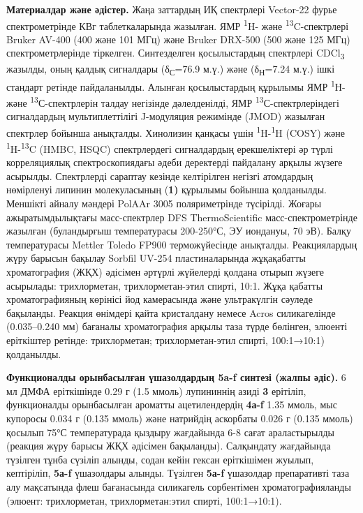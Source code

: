 \begin{multicols}{2}
{\bfseries Материалдар және әдістер.} Жаңа заттардың ИҚ спектрлері
Vector-22 фурье спектрометрінде КВг таблеткаларында жазылған. ЯМР
\textsuperscript{1}H- және \textsuperscript{13}C-спектрлері Bruker
AV-400 (400 және 101 МГц) және Bruker DRX-500 (500 және 125 МГц)
спектрометрлерінде тіркелген. Синтезделген қосылыстардың спектрлері
CDCl\textsubscript{3} жазылды, оның қалдық сигналдары
(δ\textsubscript{С}=76.9 м.ү.) және (δ\textsubscript{Н}=7.24 м.ү.) ішкі
стандарт ретінде пайдаланылды. Алынған қосылыстардың құрылымы ЯМР
\textsuperscript{1}Н- және \textsuperscript{13}С-спектрлерін талдау
негізінде дәлелденілді, ЯМР \textsuperscript{13}С-спектрлеріндегі
сигналдардың мультиплеттілігі J-модуляция режимінде (JMOD) жазылған
спектрлер бойынша анықталды. Хинолизин қанқасы үшін
\textsuperscript{1}H-\textsuperscript{1}H (COSY) және
\textsuperscript{1}H-\textsuperscript{13}C (HMBC, HSQC) спектрлердегі
сигналдардың ерекшеліктері әр түрлі корреляциялық спектроскопиядағы
әдеби деректерді пайдалану арқылы жүзеге асырылды. Спектрлерді сараптау
кезінде келтірілген негізгі атомдардың нөмірленуі липинин молекуласының
({\bfseries 1)} құрылымы бойынша қолданылды. Меншікті айналу мәндері PolAAr
3005 поляриметрінде түсірілді. Жоғары ажыратымдылықтағы масс-спектрлер
DFS ThermoScientific масс-спектрометрінде жазылған (буландырғыш
температурасы 200-250°С, ЭУ иондануы, 70 эВ). Балқу температурасы
Mettler Toledo FP900 терможүйесінде анықталды. Реакциялардың жүру
барысын бақылау Sorbfil UV-254 пластиналарында жұқақабатты хроматография
(ЖҚХ) әдісімен әртүрлі жүйелерді қолдана отырып жүзеге асырылады:
трихлорметан, трихлорметан-этил спирті, 10:1. Жұқа қабатты
хроматографияның көрінісі йод камерасында және ультракүлгін сәуледе
бақыланды. Реакция өнімдері қайта кристалдану немесе Acros силикагелінде
(0.035--0.240 мм) бағаналы хроматография арқылы таза түрде бөлінген,
элюенті еріткіштер ретінде: трихлорметан; трихлорметан-этил спирті,
100:1→10:1) қолданылды.

{\bfseries Функционалды орынбасылған үшазолдардың 5a-f синтезі (жалпы
әдіс).} 6 мл ДМФА еріткішінде 0.29 г (1.5 ммоль) лупининнің азиді
{\bfseries 3} ерітіліп, функционалды орынбасылған ароматты ацетилендердің
{\bfseries 4а-f} 1.35 ммоль, мыс купоросы 0.034 г (0.135 ммоль) және
натрийдің аскорбаты 0.026 г (0.135 ммоль) қосылып 75°С температурада
қыздыру жағдайында 6-8 сағат араластырылды (реакция жүру барысы ЖҚХ
әдісімен бақыланды). Салқындату жағдайында түзілген тұнба сүзіліп
алынды, содан кейін гексан еріткішімен жуылып, кептіріліп, {\bfseries 5а-f}
үшазолдары алынды. Түзілген {\bfseries 5а-f} үшазолдар препаративті таза
алу мақсатында флеш бағанасында силикагель сорбентімен
хроматографияланды (элюент: трихлорметан, трихлорметан:этил спирті,
100:1→10:1).


\end{multicols}
